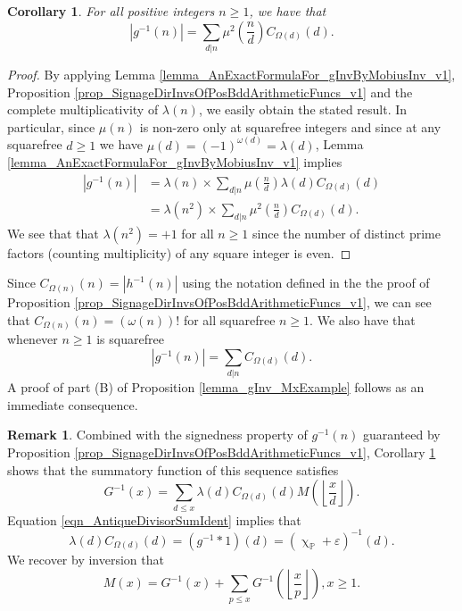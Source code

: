 \documentclass[11pt,reqno,a4letter]{article}
\numberwithin{figure}{section}
\numberwithin{table}{section}
\renewcommand{\chi}{\upchi}
\newcommand{\Floor}[2]{\ensuremath{\left\lfloor \frac{#1}{#2} \right\rfloor}}
\theoremstyle{plain}
\newtheorem{cor}[theorem]{Corollary}
\numberwithin{theorem}{section}
\theoremstyle{definition}
\newtheorem{remark}[theorem]{Remark}
\begin{document}
\begin{cor} 
\label{lemma_AbsValueOf_gInvn_FornSquareFree_v1} 
For all positive integers $n \geq 1$, we have that 
\begin{equation} 
\label{eqn_AbsValueOf_gInvn_FornSquareFree_v1} 
|g^{-1}(n)| = \sum_{d|n} \mu^2\left(\frac{n}{d}\right) C_{\Omega(d)}(d). 
\end{equation} 
\end{cor} 
\begin{proof} 
By applying 
Lemma \ref{lemma_AnExactFormulaFor_gInvByMobiusInv_v1}, 
Proposition \ref{prop_SignageDirInvsOfPosBddArithmeticFuncs_v1} and the 
complete multiplicativity of $\lambda(n)$, 
we easily obtain the stated result. 
In particular, since $\mu(n)$ is non-zero only at squarefree integers and since 
at any squarefree $d \geq 1$ we have $\mu(d) = (-1)^{\omega(d)} = \lambda(d)$, 
Lemma \ref{lemma_AnExactFormulaFor_gInvByMobiusInv_v1} implies 
\begin{align*} 
|g^{-1}(n)| & = \lambda(n) \times \sum_{d|n} \mu\left(\frac{n}{d}\right) \lambda(d) C_{\Omega(d)}(d) \\ 
     & = \lambda(n^2) \times \sum_{d|n} \mu^2\left(\frac{n}{d}\right) C_{\Omega(d)}(d). 
\end{align*} 
We see that 
that $\lambda(n^2) = +1$ for all $n \geq 1$ since the number of distinct 
prime factors (counting multiplicity) of any square integer is even. 
\end{proof} 

Since $C_{\Omega(n)}(n) = |h^{-1}(n)|$ using the notation defined in the the proof of 
Proposition \ref{prop_SignageDirInvsOfPosBddArithmeticFuncs_v1}, we can see that 
$C_{\Omega(n)}(n) = (\omega(n))!$ for all squarefree $n \geq 1$. 
We also have that whenever $n \geq 1$ is squarefree 
\[
|g^{-1}(n)| = \sum_{d|n} C_{\Omega(d)}(d). 
\]
A proof of part (B) of Proposition \ref{lemma_gInv_MxExample} 
follows as an immediate consequence. 

\begin{remark} 
Combined with the signedness property of $g^{-1}(n)$ guaranteed by 
Proposition \ref{prop_SignageDirInvsOfPosBddArithmeticFuncs_v1}, 
Corollary \ref{lemma_AbsValueOf_gInvn_FornSquareFree_v1} shows that the summatory 
function of this sequence satisfies 
\[
G^{-1}(x) = \sum_{d \leq x} \lambda(d) C_{\Omega(d)}(d) M\left(\Floor{x}{d}\right). 
\]
Equation \eqref{eqn_AntiqueDivisorSumIdent} implies that 
$$\lambda(d) C_{\Omega(d)}(d) = (g^{-1} \ast 1)(d) = (\chi_{\mathbb{P}} + \varepsilon)^{-1}(d).$$ 
We recover by inversion that 
\begin{equation}
\label{eqn_RmkInitialConnectionOfMxToGInvx_ProvedByInversion_v1} 
M(x) = G^{-1}(x) + \sum_{p \leq x} G^{-1}\left(\Floor{x}{p}\right), x \geq 1. 
\end{equation}
\end{remark} 
\end{document}
